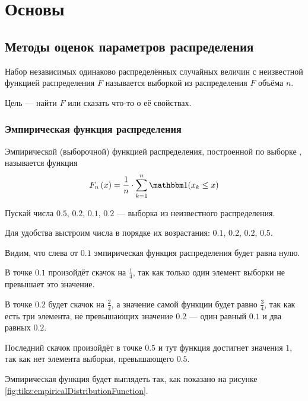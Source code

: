 \chapter{Основы}
\section{Методы оценок параметров распределения}
\begin{definition}
  Набор \xsample независимых одинаково распределённых случайных величин с
  неизвестной функцией распределения $F$ называется выборкой из распределения
  $F$ объёма $n$.
\end{definition}

Цель --- найти $F$ или сказать что-то о её свойствах.

\subsection{Эмпирическая функция распределения}
\begin{definition}
  Эмпирической (выборочной) функцией распределения,
  построенной по выборке \xsample, называется функция
  $$\cdfn{x}= \frac{1}{n}\cdot \sum_{k=1}^n
  \indicator{x_k\le x}$$
\end{definition}

\begin{example}
  \label{ex:empiricalDistributionFunction}
  Пускай числа $0.5$, $0.2$, $0.1$, $0.2$ --- выборка из неизвестного
  распределения.

  Для удобства выстроим числа в порядке их возрастания:
  $0.1$, $0.2$, $0.2$, $0.5$.

  Видим, что слева от $0.1$ эмпирическая функция распределения будет равна
  нулю.

  В точке $0.1$ произойдёт скачок на $\frac{1}{4}$, так как только один
  элемент выборки не превышает это значение.

  В точке $0.2$ будет скачок на $\frac{2}{4}$, а значение самой функции
  будет равно $\frac{3}{4}$, так как есть три элемента, не превышающих
  значение $0.2$ --- один равный $0.1$ и два равных $0.2$.

  Последний скачок произойдёт в точке $0.5$ и тут функция достигнет
  значения $1$, так как нет элемента выборки, превышающего
  $0.5$.

  Эмпирическая функция будет выглядеть так, как показано на
  рисунке \ref{fig:tikz:empiricalDistributionFunction}.
\end{example}

